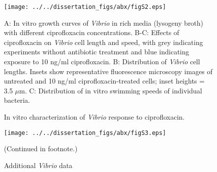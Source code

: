 
\begin{figure}[H]
	\centerline{
		\texttt{[image: ../../dissertation\_figs/abx/figS2.eps]}}
	\caption{In vitro characterization of \textit{Vibrio} response to ciprofloxacin.}{A: In vitro growth curves of \textit{Vibrio} in rich media (lysogeny broth) with different ciprofloxacin concentrations. B-C: Effects of ciprofloxacin on \textit{Vibrio} cell length and speed, with grey indicating experiments without antibiotic treatment and blue indicating exposure to 10 ng/ml ciprofloxacin. B: Distribution of \textit{Vibrio} cell lengths. Insets show representative fluorescence microscopy images of untreated and 10 ng/ml ciprofloxacin-treated cells; inset heights = 3.5 $\mu$m. C: Distribution of in vitro swimming speeds of individual bacteria.}
\end{figure}


	 

\begin{figure}[H]
	\centerline{
		\texttt{[image: ../../dissertation\_figs/abx/figS3.eps]}}
	\caption{Additional \textit{Vibrio} data}{(Continued in footnote.)}
	\label{fig:figS3}
\end{figure}

